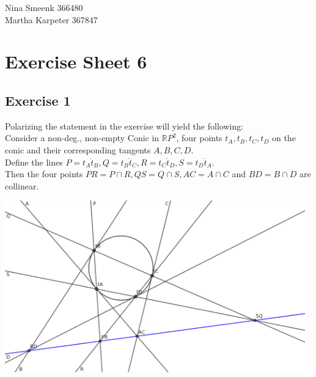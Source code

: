 \documentclass{article}
\begin{document}
	
Nina Smeenk 366480\\
Martha Karpeter 367847

\section*{Exercise Sheet 6}
\subsection*{Exercise 1}

Polarizing the statement in the exercise will yield the following:\\
Consider a non-deg., non-empty Conic in $\mathbb{R}P^2$, four points $t_A,t_B,t_C,t_D$ on the conic and their corresponding tangents $A,B,C,D$.\\
Define the lines $P=\overline{t_A t_B},Q=\overline{t_B t_C}, R=\overline{t_C t_D}, S=\overline{t_D t_A}$.\\
Then the four points $PR=P\cap R, QS=Q\cap S,AC=A \cap C$ and $BD=B \cap D$ are collinear.
\begin{center}
	\includegraphics[width=13cm]{Hausaufgabe_05_01_Dual}
\end{center}

	
\end{document}
